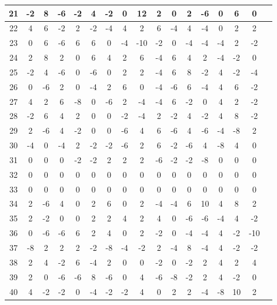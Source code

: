 \begin{tabular}{c||c|c|c|c|c|c|c|c|c|c|c|c|c|c|c|c}
\hline
21 & -2 & 8 & -6 & -2 & 4 & -2 & 0 & 12 & 2 & 0 & 2 & -6 & 0 & 6 & 0 \\
\hline
22 & 4 & 6 & -2 & 2 & -2 & -4 & 4 & 2 & 6 & -4 & 4 & -4 & 0 & 2 & 2 \\
\hline
23 & 0 & 6 & -6 & 6 & 6 & 0 & -4 & -10 & -2 & 0 & -4 & -4 & -4 & 2 & -2 \\
\hline
24 & 2 & 8 & 2 & 0 & 6 & 4 & 2 & 6 & -4 & 6 & 4 & 2 & -4 & -2 & 0 \\
\hline
25 & -2 & 4 & -6 & 0 & -6 & 0 & 2 & 2 & -4 & 6 & 8 & -2 & 4 & -2 & -4 \\
\hline
26 & 0 & -6 & 2 & 0 & -4 & 2 & 6 & 0 & -4 & -6 & 6 & -4 & 4 & 6 & -2 \\
\hline
27 & 4 & 2 & 6 & -8 & 0 & -6 & 2 & -4 & -4 & 6 & -2 & 0 & 4 & 2 & -2 \\
\hline
28 & -2 & 6 & 4 & 2 & 0 & 0 & -2 & -4 & 2 & -2 & 4 & -2 & 4 & 8 & -2 \\
\hline
29 & 2 & -6 & 4 & -2 & 0 & 0 & -6 & 4 & 6 & -6 & 4 & -6 & -4 & -8 & 2 \\
\hline
30 & -4 & 0 & -4 & 2 & -2 & -2 & -6 & 2 & 6 & -2 & -6 & 4 & -8 & 4 & 0 \\
\hline
31 & 0 & 0 & 0 & -2 & -2 & 2 & 2 & 2 & -6 & -2 & -2 & -8 & 0 & 0 & 0 \\
\hline
32 & 0 & 0 & 0 & 0 & 0 & 0 & 0 & 0 & 0 & 0 & 0 & 0 & 0 & 0 & 0 \\
\hline
33 & 0 & 0 & 0 & 0 & 0 & 0 & 0 & 0 & 0 & 0 & 0 & 0 & 0 & 0 & 0 \\
\hline
34 & 2 & -6 & 4 & 0 & 2 & 6 & 0 & 2 & -4 & -4 & 6 & 10 & 4 & 8 & 2 \\
\hline
35 & 2 & -2 & 0 & 0 & 2 & 2 & 4 & 2 & 4 & 0 & -6 & -6 & -4 & 4 & -2 \\
\hline
36 & 0 & -6 & -6 & 6 & 2 & 4 & 0 & 2 & -2 & 0 & -4 & -4 & 4 & -2 & -10 \\
\hline
37 & -8 & 2 & 2 & 2 & -2 & -8 & -4 & -2 & 2 & -4 & 8 & -4 & 4 & -2 & -2 \\
\hline
38 & 2 & 4 & -2 & 6 & -4 & 2 & 0 & 0 & -2 & 0 & -2 & 2 & 4 & 2 & 4 \\
\hline
39 & 2 & 0 & -6 & -6 & 8 & -6 & 0 & 4 & -6 & -8 & -2 & 2 & 4 & -2 & 0 \\
\hline
40 & 4 & -2 & -2 & 0 & -4 & -2 & -2 & 4 & 0 & 2 & 2 & -4 & -8 & 10 & 2
\end{tabular}

